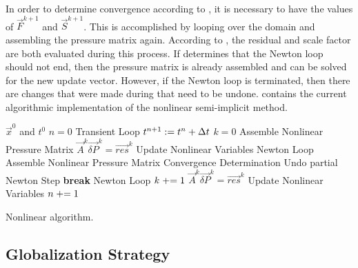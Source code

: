 In order to determine convergence according to , it is necessary to have the values of $\vec{F}^{k+1}$ and $\vec{S}^{k+1}$.
This is accomplished by looping over the domain and assembling the pressure matrix again.
According to , the residual and scale factor are both evaluated during this process.
If  determines that the Newton loop should not end, then the pressure matrix is already assembled and can be solved for the new update vector.
However, if the Newton loop is terminated, then there are changes that were made during  that need to be undone.
 contains the current algorithmic implementation of the nonlinear semi-implicit method.

\begin{algo}[h!]
\setlength{\baselineskip}{0.625\baselineskip}
\begin{algorithmic}[1]
\Require $\vec{x}^{0}$ and $t^{0}$
\Set $n = 0$
\Loop \; Transient Loop
    \Set $t^{n+1} : = t^{n} + \dt{}$
    \Set $k = 0$
	\Algorithm Assemble Nonlinear Pressure Matrix	 
	\Solve $\vec{A}^{k} \vec{\delta P}^{k} = \vec{res}^{k}$
	\Algorithm Update Nonlinear Variables  
    \Loop \; Newton Loop
		\Algorithm Assemble Nonlinear Pressure Matrix 
		\Algorithm Convergence Determination 
			\State Undo partial Newton Step
			\State \textbf{break} Newton Loop 
		\EndIf		
		\Set $k \mathrel{+}= 1$
		\Solve $\vec{A}^{k} \vec{\delta P}^{k} = \vec{res}^{k}$
		\Algorithm Update Nonlinear Variables 
	\EndLoop
	\Set $n \mathrel{+}= 1$
\EndLoop
\end{algorithmic}
\caption{Nonlinear \cobra{} algorithm.}
\label{alg:nlnCobraAlgorithm}
\end{algo}

\subsection{Globalization Strategy}
\label{subsect:nlnGlobalStrategy}


